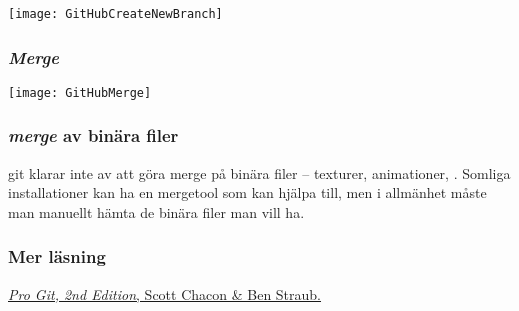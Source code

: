 \documentclass[swedish]{beamer}
\begin{document}
\begin{frame}
\texttt{[image: GitHubCreateNewBranch]}  
\end{frame}

\begin{frame}
\frametitle{\emph{Merge}}

\texttt{[image: GitHubMerge]}

\end{frame}

\begin{frame}
\frametitle{\emph{merge} av binära filer}
git klarar inte av att göra merge på binära filer -- \mao texturer, animationer, \odyl.  Somliga installationer kan ha en mergetool som kan hjälpa till, men i allmänhet måste man manuellt hämta de binära filer man vill ha.
  
\end{frame}


\begin{frame}
\frametitle{Mer läsning}  
\href{http://git-scm.com/book/en/v2/}{\textsl{Pro Git, 2nd Edition}, Scott Chacon \& Ben Straub.}
\end{frame}
\end{document}
